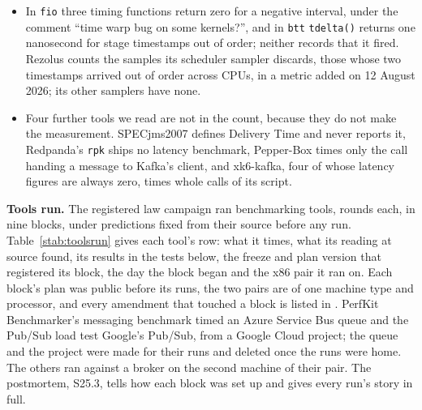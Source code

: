\documentclass[10pt,journal,onecolumn]{IEEEtran}
\begin{document}
\begin{itemize}
protects a counter and leaves its histogram alone; the guard that once deleted from the histogram
was removed in January 2025. Its printed average counts a value at or below zero as zero. RabbitMQ PerfTest's
\texttt{getDifference} returns the absolute value of the difference~\cite{rabbitmq_perftest}, so a difference below zero enters its
metrics as a positive one, uncounted. From version 2.0.0 of 2017 until version 2.25.0 of June 2026
its metrics recorded only values above zero, deleting every trip shorter than a millisecond in its
millisecond mode. RabbitMQ
Stream PerfTest has dropped values below zero since 2 June 2026, release 1.7.0, its fix for a
user's report of a negative latency during a rolling restart; before that, the library it records
into refused them and warned once.
\item In \texttt{fio} three timing functions return zero for a negative interval, under the comment
``time warp bug on some kernels?'', and in \texttt{btt} \texttt{tdelta()} returns one nanosecond
for stage timestamps out of order; neither records that it fired. Rezolus counts the samples its
scheduler sampler discards, those whose two timestamps arrived out of order across CPUs, in a metric
added on 12 August 2026; its other samplers have none.
\item Four further tools we read are not in the count, because they do not make the measurement.
SPECjms2007 defines Delivery Time and never reports it, Redpanda's \texttt{rpk} ships no latency
benchmark, Pepper-Box times only the call handing a message to Kafka's client, and xk6-kafka, four of
whose latency figures are always zero, times whole calls of its script.
\end{itemize}

\textbf{Tools run.} The registered law campaign ran \toolsRunWord{} benchmarking tools,
\toolsRoundsWord{} rounds each, in nine blocks, under predictions fixed from their source before
any run. Table~\ref{stab:toolsrun} gives each tool's row: what it times, what its reading at source
found, its results in the tests below, the freeze and plan version that registered its block, the
day the block began and the x86 pair it ran on. Each block's plan was public before its runs, the
two pairs are of one machine type and processor, and every amendment that touched a block is listed
in . PerfKit Benchmarker's messaging benchmark timed an Azure Service Bus
queue and the Pub/Sub load test Google's Pub/Sub, from a Google Cloud project; the queue and the
project were made for their runs and deleted once the runs were home. The others ran against a
broker on the second machine of their pair. The postmortem, S25.3, tells how each block was set up
and gives every run's story in full.
\end{document}
